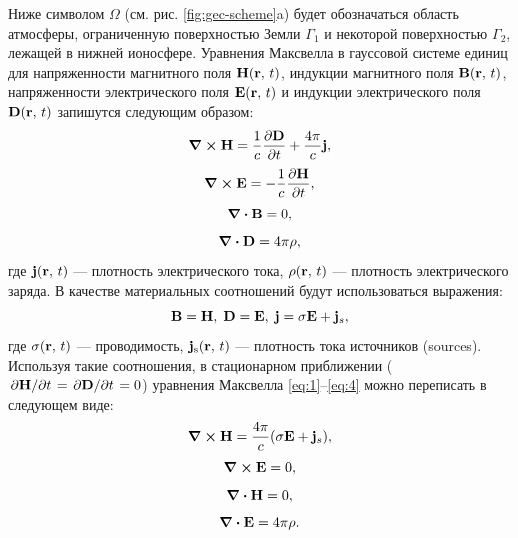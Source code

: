 Ниже символом $\Omega$ (см. рис. \ref{fig:gec-scheme}{a}) будет обозначаться область атмосферы, ограниченную поверхностью Земли $\Gamma_1$ и некоторой поверхностью $\Gamma_2$, лежащей в нижней ионосфере. Уравнения Максвелла в гауссовой системе единиц для напряженности магнитного поля $\vb{H}(\vb{r},\, t)$, индукции магнитного поля $\vb{B}(\vb{r},\, t)$, напряженности электрического поля $\vb{E}(\vb{r},\, t)$ и индукции электрического поля $\vb{D}(\vb{r},\, t)$ запишутся следующим образом:
\begin{equation}
    \curl{\vb{H}} = \dfrac1c \pdv{\vb{D}}{t} + \dfrac{4\pi}{c}\vb{j},
    \label{eq:1}
\end{equation}
\begin{equation}
    \curl{\vb{E}} = -\dfrac1c \pdv{\vb{H}}{t},
    \label{eq:2}
\end{equation}
\begin{equation}
    \div{\vb{B}} = 0,
    \label{eq:3}
\end{equation}
\begin{equation}
    \div{\vb{D}} = 4\pi\rho,
    \label{eq:4}
\end{equation}
где $\vb{j}(\vb{r},\, t)$ --- плотность электрического тока, $\rho(\vb{r},\, t)$ --- плотность электрического заряда. В качестве материальных соотношений будут использоваться выражения: 
\begin{equation}
    \vb{B} = \vb{H},\; \vb{D} = \vb{E},\; \vb{j} = \sigma \vb{E} + \vb{j}_s,
\end{equation}
где $\sigma(\vb{r},\, t)$ --- проводимость, $\vb{j}_\mathrm{s}(\vb{r},\, t)$ --- плотность тока источников (sources). Используя такие соотношения, в стационарном приближении ($\pdv*{\vb{H}}{t} = \pdv*{\vb{D}}{t} = 0$) уравнения Максвелла \eqref{eq:1}--\eqref{eq:4} можно переписать в следующем виде:
\begin{equation}
    \curl{\vb{H}} = \dfrac{4\pi}{c}\qty(\sigma \vb{E} + \vb{j}_s),
    \label{eq:5}
\end{equation}
\begin{equation}
    \curl{\vb{E}} = 0,
    \label{eq:6}
\end{equation}
\begin{equation}
    \div{\vb{H}} = 0,
    \label{eq:7}
\end{equation}
\begin{equation}
    \div{\vb{E}} = 4\pi\rho.
    \label{eq:8}
\end{equation}

